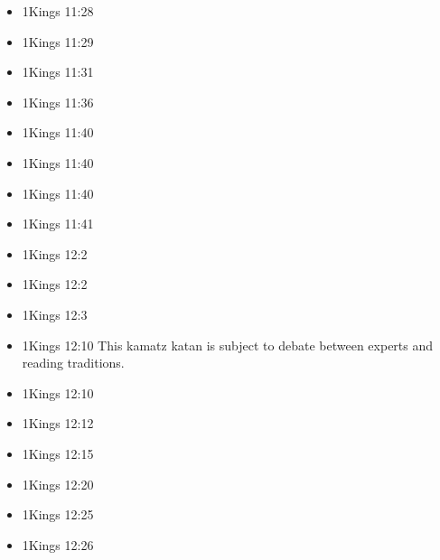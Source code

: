 \documentclass[14pt]{book}
\begin{document}
\begin{multicols}{2}
\begin{itemize}
											\item 1Kings 11:28
											
											\item 1Kings 11:29
											
											\item 1Kings 11:31
											
											\item 1Kings 11:36
											
											\item 1Kings 11:40
											
											\item 1Kings 11:40
											
											\item 1Kings 11:40
											
											\item 1Kings 11:41
											
											\item 1Kings 12:2
											
											\item 1Kings 12:2
											
											\item 1Kings 12:3
											
											\item 1Kings 12:10 This kamatz katan is subject to debate between experts and reading traditions.
											
											\item 1Kings 12:10
											
											\item 1Kings 12:12
											
											\item 1Kings 12:15
											
											\item 1Kings 12:20
											
											\item 1Kings 12:25
											
											\item 1Kings 12:26
											

\end{itemize}
\end{multicols}
\end{document}
